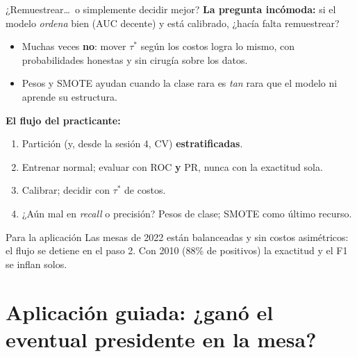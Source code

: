 \documentclass{beamer}
\newcommand{\1}{\mathbb{I}}
\begin{document}
\begin{frame}{¿Remuestrear\ldots\ o simplemente decidir mejor?}
\small
\textbf{La pregunta incómoda:} si el modelo \emph{ordena} bien (AUC decente) y está calibrado, ¿hacía falta remuestrear?
\pause
\begin{itemize}\itemsep3pt
  \item Muchas veces \textbf{no}: mover $\tau^*$ según los costos logra lo mismo, con probabilidades honestas y sin cirugía sobre los datos.
  \item Pesos y SMOTE ayudan cuando la clase rara es \emph{tan} rara que el modelo ni aprende su estructura.
\end{itemize}
\pause
\textbf{El flujo del practicante:}
\begin{enumerate}\itemsep2pt
  \item Partición (y, desde la sesión 4, CV) \textbf{estratificadas}.
  \item Entrenar normal; evaluar con ROC \textbf{y} PR, nunca con la exactitud sola.
  \item Calibrar; decidir con $\tau^*$ de costos.
  \item ¿Aún mal en \emph{recall} o precisión? Pesos de clase; SMOTE como último recurso.
\end{enumerate}
\pause
\begin{block}{Para la aplicación}
Las mesas de 2022 están balanceadas y sin costos asimétricos: el flujo se detiene en el paso 2. Con 2010 (88\% de positivos) la exactitud y el F1 se inflan solos.
\end{block}
\end{frame}


\section{Aplicación guiada: ¿ganó el eventual presidente en la mesa?}
\begin{frame}[noframenumbering]
\tableofcontents[currentsection]
\end{frame}
\end{document}
